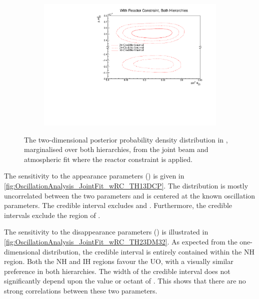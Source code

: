 \begin{figure}[h]
  \begin{subfigure}[t]{0.98\textwidth}
    \includegraphics[width=\textwidth, trim={0mm 0mm 0mm 0mm}, clip,page=1]{Figures/OA/JointFit_wRC/Contours_2D_th23_dm32_BH_1_wRC_UnSmeared_CredibleInterval.pdf}
  \end{subfigure}
  \caption{The two-dimensional posterior probability density distribution in , marginalised over both hierarchies, from the joint beam and atmospheric fit where the reactor constraint is applied.}
  \label{fig:OscillationAnalysis_JointFit_wRC_TH23DM32}
\end{figure}

The sensitivity to the appearance parameters () is given in \autoref{fig:OscillationAnalysis_JointFit_wRC_TH13DCP}. The distribution is mostly uncorrelated between the two parameters and is centered at the known oscillation parameters. The \quickmath{1\sigma} credible interval excludes  and . Furthermore, the \quickmath{3\sigma} credible intervals exclude the region of .

The sensitivity to the disappearance parameters () is illustrated in \autoref{fig:OscillationAnalysis_JointFit_wRC_TH23DM32}. As expected from the one-dimensional distribution, the \quickmath{1\sigma} credible interval is entirely contained within the NH region. Both the NH and IH regions favour the UO, with a visually similar preference in both hierarchies. The width of the  \quickmath{1\sigma} credible interval does not significantly depend upon the value or octant of . This shows that there are no strong correlations between these two parameters.

